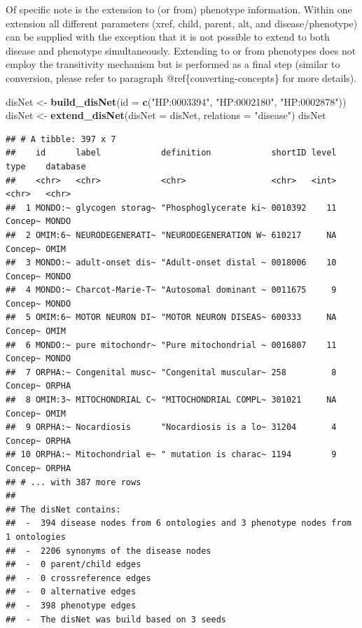 \documentclass[9pt,a4paper,]{extarticle}
\newenvironment{Shaded}{\begin{snugshade}}{\end{snugshade}}
\newcommand{\DataTypeTok}[1]{\textcolor[rgb]{0.13,0.29,0.53}{#1}}
\newcommand{\KeywordTok}[1]{\textcolor[rgb]{0.13,0.29,0.53}{\textbf{#1}}}
\newcommand{\NormalTok}[1]{#1}
\newcommand{\StringTok}[1]{\textcolor[rgb]{0.31,0.60,0.02}{#1}}
\begin{document}
Of specific note is the extension to (or from) phenotype information. Within one extension all different parameters (xref, child, parent, alt, and disease/phenotype) can be supplied with the exception that it is not possible to extend to both disease and phenotype simultaneously. Extending to or from phenotypes does not employ the transitivity mechanism but is performed as a final step (similar to conversion, please refer to paragraph @ref\{converting-concepts\} for more details).

\begin{Shaded}
\begin{Highlighting}[]
\NormalTok{disNet <-}\StringTok{ }\KeywordTok{build_disNet}\NormalTok{(}\DataTypeTok{id =} \KeywordTok{c}\NormalTok{(}\StringTok{"HP:0003394"}\NormalTok{, }\StringTok{"HP:0002180"}\NormalTok{, }\StringTok{"HP:0002878"}\NormalTok{))}
\NormalTok{disNet <-}\StringTok{ }\KeywordTok{extend_disNet}\NormalTok{(}\DataTypeTok{disNet =}\NormalTok{ disNet, }\DataTypeTok{relations =} \StringTok{"disease"}\NormalTok{)}
\NormalTok{disNet}
\end{Highlighting}
\end{Shaded}

\begin{verbatim}
## # A tibble: 397 x 7
##    id      label            definition            shortID level type    database
##    <chr>   <chr>            <chr>                 <chr>   <int> <chr>   <chr>   
##  1 MONDO:~ glycogen storag~ "Phosphoglycerate ki~ 0010392    11 Concep~ MONDO   
##  2 OMIM:6~ NEURODEGENERATI~ "NEURODEGENERATION W~ 610217     NA Concep~ OMIM    
##  3 MONDO:~ adult-onset dis~ "Adult-onset distal ~ 0018006    10 Concep~ MONDO   
##  4 MONDO:~ Charcot-Marie-T~ "Autosomal dominant ~ 0011675     9 Concep~ MONDO   
##  5 OMIM:6~ MOTOR NEURON DI~ "MOTOR NEURON DISEAS~ 600333     NA Concep~ OMIM    
##  6 MONDO:~ pure mitochondr~ "Pure mitochondrial ~ 0016807    11 Concep~ MONDO   
##  7 ORPHA:~ Congenital musc~ "Congenital muscular~ 258         8 Concep~ ORPHA   
##  8 OMIM:3~ MITOCHONDRIAL C~ "MITOCHONDRIAL COMPL~ 301021     NA Concep~ OMIM    
##  9 ORPHA:~ Nocardiosis      "Nocardiosis is a lo~ 31204       4 Concep~ ORPHA   
## 10 ORPHA:~ Mitochondrial e~ " mutation is charac~ 1194        9 Concep~ ORPHA   
## # ... with 387 more rows
## 
## The disNet contains:
##  -  394 disease nodes from 6 ontologies and 3 phenotype nodes from 1 ontologies 
##  -  2206 synonyms of the disease nodes
##  -  0 parent/child edges
##  -  0 crossreference edges
##  -  0 alternative edges
##  -  398 phenotype edges
##  -  The disNet was build based on 3 seeds
\end{verbatim}
\end{document}
